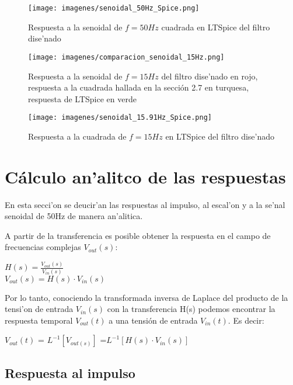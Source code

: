 \documentclass[12pt, titlepage]{article}
\begin{document}
    \begin{figure}[!htb]
    \texttt{[image: imagenes/senoidal\_50Hz\_Spice.png]}
    \centering
    \caption{Respuesta a la senoidal de $f = 50Hz$ cuadrada en LTSpice del filtro dise'nado}
    \end{figure}
    
    \newpage
    
    \begin{figure}[!htb]
    \texttt{[image: imagenes/comparacion\_senoidal\_15Hz.png]}
    \centering
    \caption{Respuesta a la senoidal de $f = 15Hz$  del filtro dise'nado en rojo, respuesta a la cuadrada hallada en la sección 2.7 en turquesa, respuesta de LTSpice en verde}
    \end{figure}
    
    \begin{figure}[!htb]
    \texttt{[image: imagenes/senoidal\_15.91Hz\_Spice.png]}
    \centering
    \caption{Respuesta a la cuadrada de $f = 15Hz$ en LTSpice del filtro dise'nado}
    \end{figure}
    
    \newpage
    
    \section{Cálculo an'alitco de las respuestas}
    
    En esta secci'on se deucir'an las respuestas al impulso, al escal'on y a la se'nal senoidal de 50Hz de manera an'alitica.
    
    A partir de la transferencia es posible obtener la respuesta en el campo de frecuencias complejas $V_{out}(s)$:  
    \begin{center}
        $H(s) = \frac{V_{out}(s)}{V_{in}(s)}$\\
        $V_{out}(s) = H(s)\cdot V_{in}(s)$
    \end{center}

    Por lo tanto, conociendo la transformada inversa de Laplace del producto de la tensi'on de entrada $V_{in}(s)$ con la transferencia H(s) podemos encontrar la respuesta temporal $V_{out}(t)$ a una tensión de entrada $V_{in}(t)$. Es decir: 
    
    \begin{center}
        $V_{out}(t)$ = $L^{-1}[V_{out(s)}]$ =$L^{-1}[H(s)\cdot V_{in}(s)] $
    \end{center}
    
    \subsection{Respuesta al impulso}
    
\end{document}
